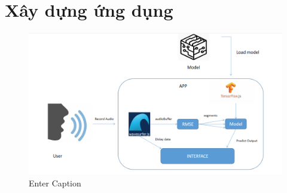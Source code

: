 \chapter{Xây dựng ứng dụng}

\begin{figure}
    \centering
    \includegraphics[width=0.5\linewidth]{images/application.png}
    \caption{Enter Caption}
    \label{fig:enter-label}
\end{figure}